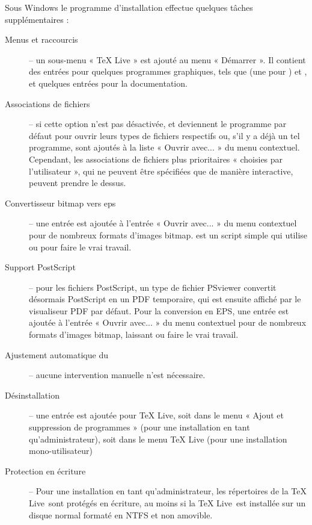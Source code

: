 \documentclass[german, english, french]{article}
\renewcommand{\TL}{\TeX{} Live\xspace}%
\begin{document}
Sous Windows le programme d'installation effectue quelques tâches
supplémentaires :
\begin{description}
\item[Menus et raccourcis] -- un sous-menu « \TL{} » est ajouté au menu
  « Démarrer ». Il contient des entrées pour quelques programmes graphiques,
  tels que  (une \GUI{} pour ) et , et
  quelques entrées pour la documentation.

\item[Associations de fichiers] -- si cette option n'est pas désactivée,
   et  deviennent le programme par défaut pour
  ouvrir leurs types de fichiers respectifs ou, s'il y a déjà un tel programme,
  sont ajoutés à la liste « Ouvrir avec... » du menu contextuel. Cependant, les
  associations de fichiers plus prioritaires « choisies par l'utilisateur », qui
  ne peuvent être spécifiées que de manière interactive, peuvent prendre le
  dessus.

\item[Convertisseur bitmap vers eps] -- une entrée  est
  ajoutée à l'entrée « Ouvrir avec... » du menu contextuel pour de nombreux
  formats d'images bitmap.  est un script simple qui utilise
   ou  pour faire le vrai travail.

\item[Support PostScript] -- pour les fichiers PostScript, un type de fichier
  PSviewer convertit désormais PostScript en un PDF temporaire, qui est ensuite
  affiché par le visualiseur PDF par défaut. Pour la conversion en EPS, une
  entrée  est ajoutée à l'entrée « Ouvrir avec... » du menu
  contextuel pour de nombreux formats d'images bitmap, laissant
   ou  faire le vrai travail.

\item[Ajustement automatique du ] -- aucune intervention manuelle
  n'est nécessaire.

\item[Désinstallation] -- une entrée est ajoutée pour \TL{}, soit dans le menu
  « Ajout et suppression de programmes » (pour une installation en tant
  qu'administrateur), soit dans le menu \TL{} (pour une installation
  mono-utilisateur)

\item[Protection en écriture] -- Pour une installation en tant
  qu'administrateur, les répertoires de la \TL\ sont protégés en écriture, au
  moins si la \TL\ est installée sur un disque normal formaté en NTFS et non
  amovible.
\end{description}
\end{document}
